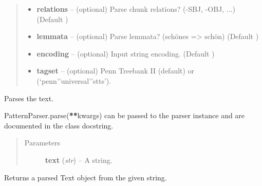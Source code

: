 \documentclass[letterpaper,10pt,english]{sphinxmanual}
\begin{document}
\begin{fulllineitems}
\begin{quote}
\begin{description}
\begin{itemize}
\item {} 
\textbf{relations} -- (optional) Parse chunk relations? (-SBJ, -OBJ, ...) (Default )

\item {} 
\textbf{lemmata} -- (optional) Parse lemmata? (schönes =\textgreater{} schön) (Default )

\item {} 
\textbf{encoding} -- (optional) Input string encoding. (Default )

\item {} 
\textbf{tagset} -- (optional) Penn Treebank II (default) or (`penn'\textbar{}'universal'\textbar{}'stts').

\end{itemize}

\end{description}\end{quote}

\begin{fulllineitems}
\label{api_reference:textblob_de.parsers.PatternParser.parse}
Parses the text.

PatternParser.parse({\color{red}\bfseries{}**}kwargs) can be passed to the parser instance and
are documented in the class docstring.
\begin{quote}\begin{description}
\item[{Parameters}] \leavevmode
\textbf{text} (\emph{str}) -- A string.

\end{description}\end{quote}

\end{fulllineitems}


\begin{fulllineitems}
\label{api_reference:textblob_de.parsers.PatternParser.parsetree}
Returns a parsed  Text object from the given string.

\end{fulllineitems}


\end{fulllineitems}
\end{document}
